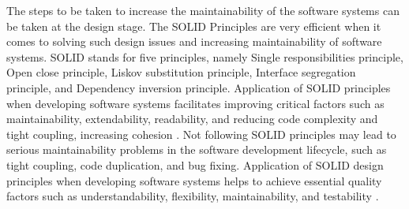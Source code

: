 The steps to be taken to increase the maintainability of the software systems can be taken at the design stage. The SOLID Principles are very efficient when it comes to solving such design issues and increasing maintainability of software systems. SOLID stands for five principles, namely Single responsibilities principle, Open close principle, Liskov substitution principle, Interface segregation principle, and Dependency inversion principle. Application of SOLID principles when developing software systems facilitates improving critical factors such as maintainability, extendability, readability, and reducing code complexity and tight coupling, increasing cohesion \cite{26}. Not following SOLID principles may lead to serious maintainability problems in the software development lifecycle, such as tight coupling, code duplication, and bug fixing. Application of SOLID design principles when developing software systems helps to achieve essential quality factors such as understandability, flexibility, maintainability, and testability \cite{26}.